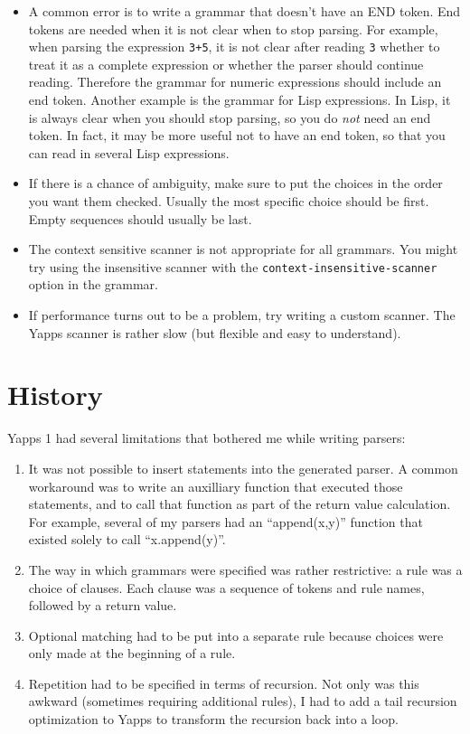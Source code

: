 \documentclass[10pt]{article}
\newcommand{\mysection}[1]{\section{#1}}
\begin{document}
\begin{itemize}
 \item A common error is to write a grammar that doesn't have an END
   token.  End tokens are needed when it is not clear when to stop
   parsing.  For example, when parsing the expression {\tt 3+5}, it is 
   not clear after reading {\tt 3} whether to treat it as a complete
   expression or whether the parser should continue reading.
   Therefore the grammar for numeric expressions should include an end 
   token.  Another example is the grammar for Lisp expressions.  In
   Lisp, it is always clear when you should stop parsing, so you do
   \emph{not} need an end token.  In fact, it may be more useful not
   to have an end token, so that you can read in several Lisp expressions.
 \item If there is a chance of ambiguity, make sure to put the choices 
   in the order you want them checked.  Usually the most specific
   choice should be first.  Empty sequences should usually be last.
 \item The context sensitive scanner is not appropriate for all
   grammars.  You might try using the insensitive scanner with the
   {\tt context-insensitive-scanner} option in the grammar.
 \item If performance turns out to be a problem, try writing a custom
   scanner.  The Yapps scanner is rather slow (but flexible and easy
   to understand).
\end{itemize}

\mysection{History}

Yapps 1 had several limitations that bothered me while writing
parsers:

\begin{enumerate}
 \item It was not possible to insert statements into the generated
   parser.  A common workaround was to write an auxilliary function
   that executed those statements, and to call that function as part
   of the return value calculation.  For example, several of my
   parsers had an ``append(x,y)'' function that existed solely to call 
   ``x.append(y)''.
 \item The way in which grammars were specified was rather
   restrictive: a rule was a choice of clauses.  Each clause was a
   sequence of tokens and rule names, followed by a return value.
 \item Optional matching had to be put into a separate rule because
   choices were only made at the beginning of a rule.
 \item Repetition had to be specified in terms of recursion.  Not only 
   was this awkward (sometimes requiring additional rules), I had to
   add a tail recursion optimization to Yapps to transform the
   recursion back into a loop.
\end{enumerate}
\end{document}
